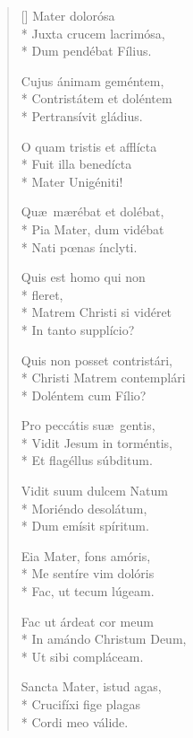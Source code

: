 \newHymn
{}

\begin{multicols}{2}
\begin{verse}[\versewidth]
{} Mater dolorósa\\*
Juxta crucem lacrimósa,\\*
Dum pendébat Fílius.
\pointtrans

Cujus ánimam geméntem,\\*
Contristátem et doléntem\\*
Pertransívit gládius.

O quam tristis et afflícta\\*
Fuit illa benedícta\\*
Mater Unigéniti!

Qu\ae\ m\ae rébat et dolébat,\\*
Pia Mater, dum vidébat\\*
Nati p\oe nas ínclyti.

Quis est homo qui non\\*
\qquad fleret,\\*
Matrem Christi si vidéret\\*
In tanto supplício?

Quis non posset contristári,\\*
Christi Matrem contemplári\\*
Doléntem cum Fílio?

Pro peccátis su\ae\ gentis,\\*
Vidit Jesum in torméntis,\\*
Et flagéllus súbditum.

Vidit suum dulcem Natum\\*
Moriéndo desolátum,\\*
Dum emísit spíritum.

Eia Mater, fons amóris,\\*
Me sentíre vim dolóris\\*
Fac, ut tecum lúgeam.

Fac ut árdeat cor meum\\*
In amándo Christum Deum,\\*
Ut sibi compláceam.

Sancta Mater, istud agas,\\*
Crucifíxi fige plagas\\*
Cordi meo válide.


\end{verse}
\end{multicols}
